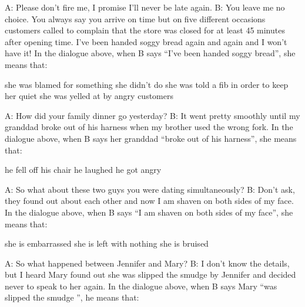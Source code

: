 \documentclass[output=paper]{langsci/langscibook}
\begin{document}
\begin{subappendices}
{\begin{exe}
    \newpage
     \begin{xlist}
        \sn A: Please don't fire me, I promise I’ll never be late again.
        \sn B: You leave me no choice. You always say you arrive on time but on five different occasions customers called to complain that the store was closed for at least 45 minutes after opening time. I've been handed soggy bread again and again and I won't have it!
        \sn In the dialogue above, when B says \enquote{I've been handed soggy bread}, she means that:
        \begin{xlist}
         she was blamed for something she didn't do
         she was told a fib in order to keep her quiet
         she was yelled at by angry customers
        \end{xlist}
        \end{xlist}
     \begin{xlist}
        \sn A: How did your family dinner go yesterday?
        \sn B: It went pretty smoothly until my granddad broke out of his harness when my brother used the wrong fork.
        \sn In the dialogue above, when B says her granddad \enquote{broke out of his harness}, she means that:
        \begin{xlist}
         he fell off his chair
         he laughed
         he got angry
        \end{xlist}
        \end{xlist}
     \begin{xlist}
        \sn A: So what about these two guys you were dating simultaneously?
        \sn B: Don’t ask, they found out about each other and now I am shaven on both sides of my face.
        \sn In the dialogue above, when B says \enquote{I am shaven on both sides of my face}, she means that:
        \begin{xlist}
         she is embarrassed
         she is left with nothing
         she is bruised
        \end{xlist}
        \end{xlist}
     \begin{xlist}
        \sn A: So what happened between Jennifer and Mary?
        \sn B: I don't know the details, but I heard Mary found out she was slipped the smudge by Jennifer and decided never to speak to her again.
        \sn In the dialogue above, when B says Mary \enquote{was slipped the smudge }, he means that:
        \begin{xlist}

\end{xlist}
\end{xlist}
\end{exe}}
\end{subappendices}
\end{document}
